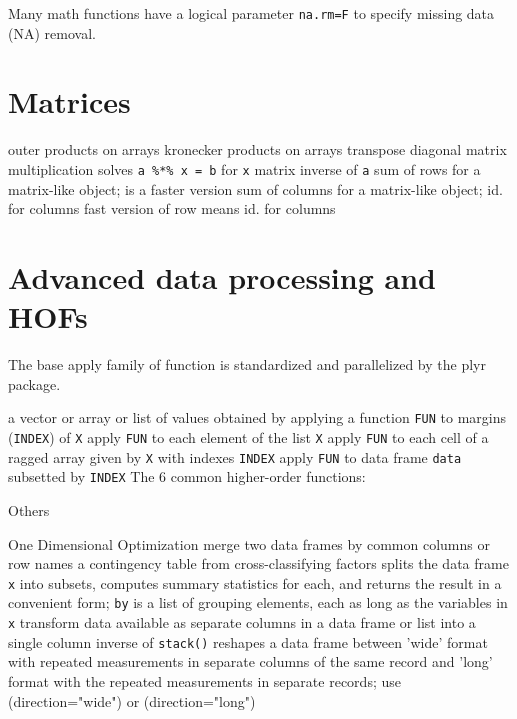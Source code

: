 Many math functions have a logical parameter {\tt na.rm=F} to
specify missing data (NA) removal.

\section{Matrices}{}

	{outer products on arrays}
	{kronecker products on arrays}
	{transpose}
	{diagonal}
\cmdL{\%*\%}	{matrix multiplication}
	{solves {\tt a \%*\% x = b} for {\tt x}}
	{matrix inverse of {\tt a}}
	{sum of rows for a matrix-like object;}
	{is a faster version}
	{sum of columns for a matrix-like object;}
	{id. for columns}
	{fast version of row means}
	{id. for columns}

\section{Advanced data processing and HOFs}{}

The base apply family of function is standardized and parallelized by the plyr package.

	{a vector or array or list of values obtained by applying a function {\tt FUN} to margins ({\tt INDEX}) of {\tt X}}
	{apply {\tt FUN} to each element of the list {\tt X}}
	{apply {\tt FUN} to each cell of a ragged array given by {\tt X} with indexes {\tt INDEX}}
	{apply {\tt FUN} to data frame {\tt data} subsetted by {\tt INDEX}}
The 6 common higher-order functions:


Others

	{One Dimensional Optimization}
	{merge two data frames by common columns or row names}
	{a contingency table from cross-classifying factors}
	{splits the data frame {\tt x} into subsets, computes summary statistics for each, and returns the result in a convenient form; {\tt by} is a list of grouping elements, each as long as the variables in {\tt x}}
	{transform data available as separate columns in a data frame or list into a single column}
	{inverse of {\tt stack()}}
	{reshapes a data frame between 'wide' format
    with repeated measurements in separate columns of the same record
    and 'long' format with the repeated measurements in separate
    records; use \code(direction="wide") or \code(direction="long")}

